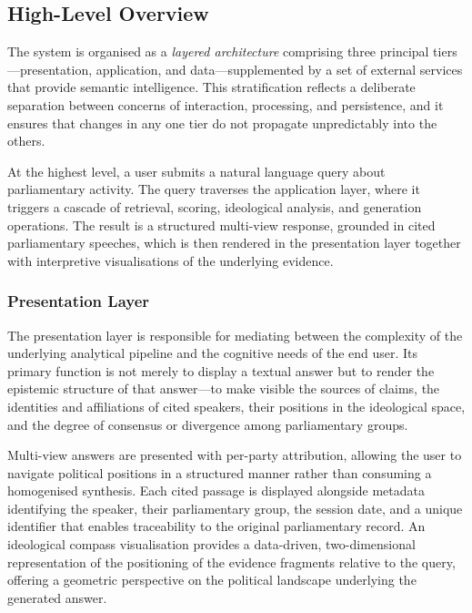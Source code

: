 \subsection{High-Level Overview}
\label{sec:high-level-overview}

The system is organised as a \textit{layered architecture} comprising three principal
tiers---presentation, application, and data---supplemented by a set of external services
that provide semantic intelligence. This stratification reflects a deliberate separation
between concerns of interaction, processing, and persistence, and it ensures that changes
in any one tier do not propagate unpredictably into the others.

At the highest level, a user submits a natural language query about parliamentary activity.
The query traverses the application layer, where it triggers a cascade of retrieval,
scoring, ideological analysis, and generation operations. The result is a structured
multi-view response, grounded in cited parliamentary speeches, which is then rendered in
the presentation layer together with interpretive visualisations of the underlying evidence.

\subsubsection{Presentation Layer}

The presentation layer is responsible for mediating between the complexity of the
underlying analytical pipeline and the cognitive needs of the end user. Its primary
function is not merely to display a textual answer but to render the epistemic structure of
that answer---to make visible the sources of claims, the identities and affiliations of
cited speakers, their positions in the ideological space, and the degree of consensus or
divergence among parliamentary groups.

Multi-view answers are presented with per-party attribution, allowing the user to navigate
political positions in a structured manner rather than consuming a homogenised synthesis.
Each cited passage is displayed alongside metadata identifying the speaker, their
parliamentary group, the session date, and a unique identifier that enables traceability
to the original parliamentary record. An ideological compass visualisation provides a
data-driven, two-dimensional representation of the positioning of the evidence fragments
relative to the query, offering a geometric perspective on the political landscape
underlying the generated answer.


